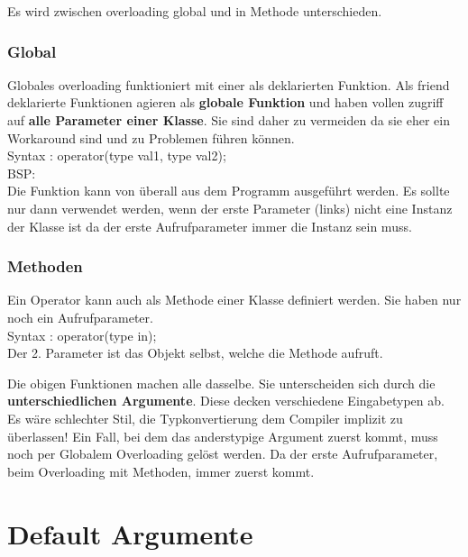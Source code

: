 Es wird zwischen overloading global und in Methode unterschieden.

\subsubsection{Global}

Globales overloading funktioniert mit einer als  deklarierten Funktion. 
Als friend deklarierte Funktionen agieren als \textbf{globale Funktion} und haben vollen zugriff auf \textbf{alle Parameter einer Klasse}. 
Sie sind daher zu vermeiden da sie eher ein Workaround sind und zu Problemen führen können.\\ 

Syntax :  operator(type val1, type val2);\\
BSP:\\



Die Funktion kann von überall aus dem Programm ausgeführt werden. 
Es sollte nur dann verwendet werden, wenn der erste Parameter (links) nicht eine Instanz der Klasse ist da der erste Aufrufparameter immer die Instanz sein muss.  

\subsubsection{Methoden}

Ein Operator kann auch als Methode einer Klasse definiert werden. 
Sie haben nur noch ein Aufrufparameter.\\
Syntax :  operator(type in);\\
Der 2. Parameter ist das Objekt selbst, welche die Methode aufruft.



Die obigen Funktionen machen alle dasselbe. 
Sie unterscheiden sich durch die \textbf{unterschiedlichen Argumente}. 
Diese decken verschiedene Eingabetypen ab. 
Es wäre schlechter Stil, die Typkonvertierung dem Compiler implizit zu überlassen! 
Ein Fall, bei dem das anderstypige Argument zuerst kommt, muss noch per Globalem Overloading gelöst werden. 
Da der erste Aufrufparameter, beim Overloading mit Methoden, immer zuerst kommt. 
 
\section{Default Argumente}

